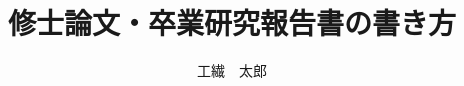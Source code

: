 \documentclass[a4j,12pt,twoside]{jreport}
\author{工繊　太郎}
\title{修士論文・卒業研究報告書の書き方}
\begin{document}
\maketitle







\begin{contents}
\tableofcontents %
\end{contents}













\end{document}
